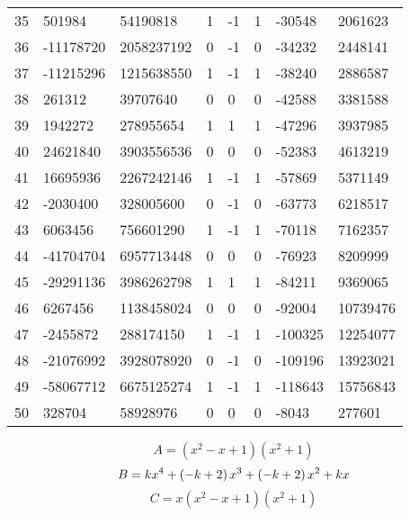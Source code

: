 \documentclass{amsart}
\begin{document}
\begin{longtable}{|l|l|l|lllll|}
35&501984&54190818&1&-1&1&-30548&2061623\\
36&-11178720&2058237192&0&-1&0&-34232&2448141\\
37&-11215296&1215638550&1&-1&1&-38240&2886587\\
38&261312&39707640&0&0&0&-42588&3381588\\
39&1942272&278955654&1&1&1&-47296&3937985\\
40&24621840&3903556536&0&0&0&-52383&4613219\\
41&16695936&2267242146&1&-1&1&-57869&5371149\\
42&-2030400&328005600&0&-1&0&-63773&6218517\\
43&6063456&756601290&1&-1&1&-70118&7162357\\
44&-41704704&6957713448&0&0&0&-76923&8209999\\
45&-29291136&3986262798&1&1&1&-84211&9369065\\
46&6267456&1138458024&0&0&0&-92004&10739476\\
47&-2455872&288174150&1&-1&1&-100325&12254077\\
48&-21076992&3928078920&0&-1&0&-109196&13923021\\
49&-58067712&6675125274&1&-1&1&-118643&15756843\\
50&328704&58928976&0&0&0&-8043&277601\\
\hline
\end{longtable}
$$A=(x^2
 - x
 + 1)(x^2
 + 1)$$
$$B=k\*x^4
 + \left(-k
 + 2\right) \*x^3
 + \left(-k
 + 2\right) \*x^2
 + k\*x$$
$$C=x(x^2
 - x
 + 1)(x^2
 + 1)$$
\end{document}
